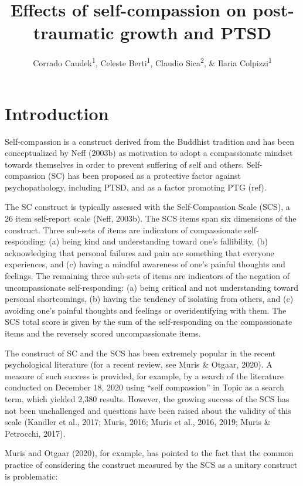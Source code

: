 \documentclass[
  english,
  man,floatsintext]{apa7}
\title{Effects of self-compassion on post-traumatic growth and PTSD}
\author{Corrado Caudek\textsuperscript{1}, Celeste Berti\textsuperscript{1}, Claudio Sica\textsuperscript{2}, \& Ilaria Colpizzi\textsuperscript{1}}
\date{}
\affiliation{\vspace{0.5cm}\textsuperscript{1} NEUROFARBA Department, Psychology Section, University of Florence, Italy\\\textsuperscript{2} Health Sciences Department, Psychology Section, University of Florence, Italy}
\begin{document}
\maketitle

\hypertarget{introduction}{%
\section{Introduction}\label{introduction}}

Self-compassion is a construct derived from the Buddhist tradition and has been conceptualized by Neff (2003b) as motivation to adopt a compassionate mindset towards themselves in order to prevent suffering of self and others.
Self-compassion (SC) has been proposed as a protective factor against psychopathology, including PTSD, and as a factor promoting PTG (ref).

The SC construct is typically assessed with the Self-Compassion Scale (SCS), a 26 item self-report scale (Neff, 2003b).
The SCS items span six dimensions of the construct.
Three sub-sets of items are indicators of compassionate self-responding: (a) being kind and understanding toward one's fallibility, (b) acknowledging that personal failures and pain are something that everyone experiences, and (c) having a mindful awareness of one's painful thoughts and feelings.
The remaining three sub-sets of items are indicators of the negation of uncompassionate self-responding: (a) being critical and not understanding toward personal shortcomings, (b) having the tendency of isolating from others, and (c) avoiding one's painful thoughts and feelings or overidentifying with them.
The SCS total score is given by the sum of the self-responding on the compassionate items and the reversely scored uncompassionate items.

The construct of SC and the SCS has been extremely popular in the recent psychological literature (for a recent review, see Muris \& Otgaar, 2020).
A measure of such success is provided, for example, by a search of the literature conducted on December 18, 2020 using ``self compassion'' in Topic as a search term, which yielded 2,380 results.
However, the growing success of the SCS has not been unchallenged and questions have been raised about the validity of this scale (Kandler et al., 2017; Muris, 2016; Muris et al., 2016, 2019; Muris \& Petrocchi, 2017).

Muris and Otgaar (2020), for example, has pointed to the fact that the common practice of considering the construct measured by the SCS as a unitary construct is problematic:
\end{document}
